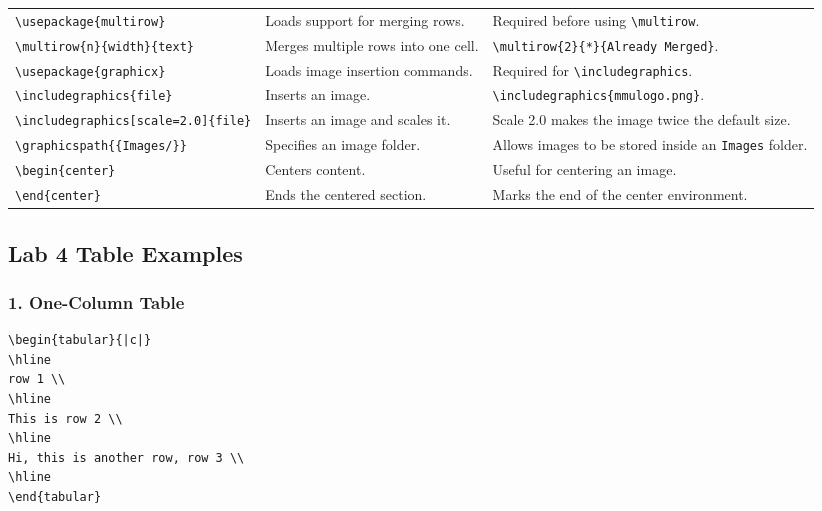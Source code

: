 \documentclass[a4paper,10pt]{article}
\begin{document}
\begin{longtable}{p{} p{} p{}}
\texttt{\textbackslash usepackage\{multirow\}} &
Loads support for merging rows. &
Required before using \texttt{\textbackslash multirow}.
\\

\texttt{\textbackslash multirow\{n\}\{width\}\{text\}} &
Merges multiple rows into one cell. &
\texttt{\textbackslash multirow\{2\}\{*\}\{Already Merged\}}.
\\

\texttt{\textbackslash usepackage\{graphicx\}} &
Loads image insertion commands. &
Required for \texttt{\textbackslash includegraphics}.
\\

\texttt{\textbackslash includegraphics\{file\}} &
Inserts an image. &
\texttt{\textbackslash includegraphics\{mmulogo.png\}}.
\\

\texttt{\textbackslash includegraphics[scale=2.0]\{file\}} &
Inserts an image and scales it. &
Scale 2.0 makes the image twice the default size.
\\

\texttt{\textbackslash graphicspath\{\{Images/\}\}} &
Specifies an image folder. &
Allows images to be stored inside an \texttt{Images} folder.
\\

\texttt{\textbackslash begin\{center\}} &
Centers content. &
Useful for centering an image.
\\

\texttt{\textbackslash end\{center\}} &
Ends the centered section. &
Marks the end of the center environment.
\\

\end{longtable}



\subsection{Lab 4 Table Examples}

\subsubsection{1. One-Column Table}

\begin{verbatim}
\begin{tabular}{|c|}
\hline
row 1 \\
\hline
This is row 2 \\
\hline
Hi, this is another row, row 3 \\
\hline
\end{tabular}
\end{verbatim}
\end{document}
